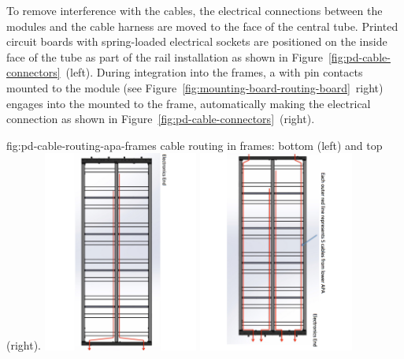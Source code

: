 To remove interference with the  cables, the electrical connections between the  modules and the  cable harness are moved to the face of the central  tube.  Printed circuit boards with spring-loaded electrical sockets are positioned on the inside face of the tube as part of the  rail installation as shown in Figure~\ref{fig:pd-cable-connectors}~(left).  During  integration into the  frames, a  with pin contacts mounted to the  module (see Figure~\ref{fig:mounting-board-routing-board}~right) engages into the  mounted to the  frame, automatically making the electrical connection as shown in 
Figure~\ref{fig:pd-cable-connectors}~(right).

\begin{dunefigure}
{fig:pd-cable-routing-apa-frames}
{ cable routing in  frames: bottom  (left) and top  (right).}
	\includegraphics[angle=90,height=6.6cm]{graphics/pds-lower-apa-pds-cable-routing}
	\includegraphics[angle=90,height=6.6cm]{graphics/pds-upper-apa-pds-cable-routing}
	\vspace{-1.5cm}
\end{dunefigure}


